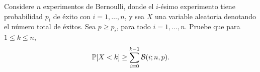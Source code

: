 \begin{statement}{24}
  Considere $n$ experimentos de Bernoulli, donde el $i$-\'esimo experimento tiene
  probabilidad $p_i$ de \'exito con $i = 1, \dots, n$, y sea $X$ una variable aleatoria denotando
  el n\'umero total de \'exitos. Sea $p \geq p_i$, para todo $i = 1, \dots, n$.
  Pruebe que para $1 \leq k \leq n$,
  \[
    \mathbb{P}[X < k] \geq \sum_{i = 0}^{k - 1} \mathcal{B}(i; n, p).
  \]
\end{statement}